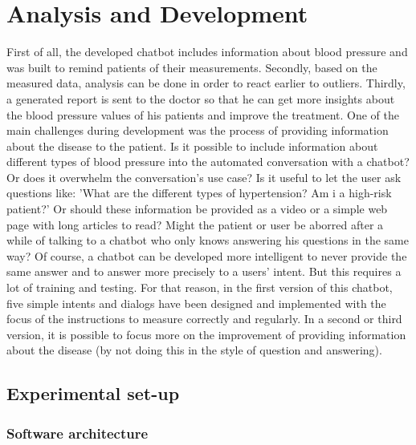 \chapter{Analysis and Development}
First of all, the developed chatbot includes information about blood pressure and was built to remind patients of their measurements. Secondly, based on the measured data, analysis can be done in order to react earlier to outliers. Thirdly, a generated report is sent to the doctor so that he can get more insights about the blood pressure values of his patients and improve the treatment.
One of the main challenges during development was the process of providing information about the disease to the patient. Is it possible to include information about different types of blood pressure into the automated conversation with a chatbot? Or does it overwhelm the conversation's use case? Is it useful to let the user ask questions like: 'What are the different types of hypertension? Am i a high-risk patient?' 
Or should these information be provided as a video or a simple web page with long articles to read? Might the patient or user be aborred after a while of talking to a chatbot who only knows answering his questions in the same way?
Of course, a chatbot can be developed more intelligent to never provide the same answer and to answer more precisely to a users' intent. But this requires a lot of training and testing. 
For that reason, in the first version of this chatbot, five simple intents and dialogs have been designed and implemented with the focus of the instructions to measure correctly and regularly. 
In a second or third version, it is possible to focus more on the improvement of providing information about the disease (by not doing this in the style of question and answering).

\section{Experimental set-up}

\subsection{Software architecture}

